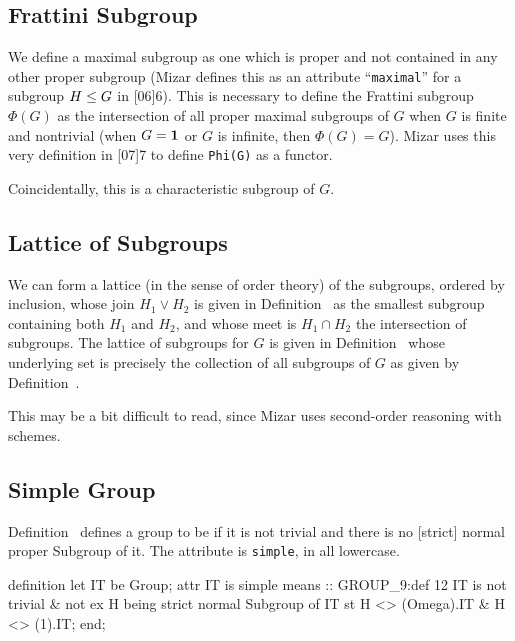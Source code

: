 \subsection{Frattini Subgroup}
We define a maximal subgroup as one which is proper and not contained in
any other proper subgroup (Mizar defines this as an attribute ``\lstinline{maximal}'' for a
subgroup $H\leq G$ in [06]{6}).
This is necessary to define the Frattini subgroup $\Phi(G)$ as the
intersection of all proper maximal subgroups of $G$ when $G$ is finite
and nontrivial (when $G=\mathbf{1}$ or $G$ is infinite, then
$\Phi(G)=G$). Mizar uses this very definition in
[07]{7} to define \lstinline{Phi(G)}
as a functor.

Coincidentally, this is a characteristic subgroup of $G$.

\subsection{Lattice of Subgroups}
We can form a lattice (in the sense of order theory) of the subgroups,
ordered by inclusion, whose join $H_{1}\lor H_{2}$ is given in
Definition~ as the smallest subgroup
containing both $H_{1}$ and $H_{2}$, and whose meet is $H_{1}\cap H_{2}$
the intersection of subgroups. The lattice of subgroups for $G$ is given
in Definition~ whose underlying set is precisely the
collection of all subgroups of $G$ as given by Definition~.

This may be a bit difficult to read, since Mizar uses second-order
reasoning with schemes.

\subsection{Simple Group}
Definition~ defines a group to be
if it is not trivial and there is no [strict] normal proper Subgroup of
it. The attribute is
\lstinline{simple}, in all lowercase.

\begin{mizar}
definition
  let IT be Group;
  attr IT is simple means
  :: GROUP_9:def 12
  IT is not trivial & not ex H being strict
  normal Subgroup of IT st H <> (Omega).IT & H <> (1).IT;
end;
\end{mizar}
